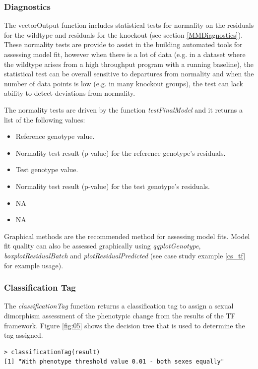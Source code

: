 \documentclass[12pt,a4paper]{article}
\begin{document}
\subsubsection{Diagnostics}
The vectorOutput function includes statistical tests for normality on the residuals for the wildtype and residuals for the knockout (see section \ref{MMDiagnostics}). These normality tests are provide to assist in the building automated tools for assessing model fit, however when there is a lot of data (e.g. in a dataset where the wildtype arises from a high throughput program with a running baseline), the statistical test can be overall sensitive to departures from normality and when the number of data points is low (e.g. in many knockout groups), the test can lack ability to detect deviations from normality.

The normality tests are driven by the function \textit{testFinalModel} and it returns a list of the following values:
\begin{itemize}
\item Reference genotype value.
\item Normality test result (p-value) for the reference genotype's residuals.
\item Test genotype value.
\item Normality test result (p-value) for the test genotype's residuals.
\item NA
\item NA
\end{itemize}

Graphical methods are the recommended method for assessing model fits. Model fit quality can also be assessed graphically using \textit{qqplotGenotype},  \textit{boxplotResidualBatch} and  \textit{plotResidualPredicted} (see case study example \ref{cs_tf} for example usage).

\subsubsection{Classification Tag}
\label{TF_classificationTag}
The \textit{classificationTag} function returns a classification tag to assign a sexual dimorphism assessment of the phenotypic change from the results of the TF framework. Figure \ref{fig:05} shows the decision tree that is used to determine the tag assigned. 

\begingroup
\fontsize{8pt}{12pt}\selectfont
\begin{verbatim}
> classificationTag(result)
[1] "With phenotype threshold value 0.01 - both sexes equally"
\end{verbatim}
\endgroup
\end{document}
